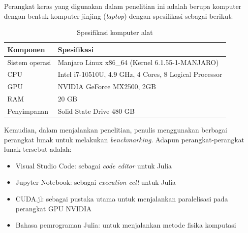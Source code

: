 Perangkat keras yang digunakan dalam penelitian ini adalah berupa komputer
dengan bentuk komputer jinjing (\emph{laptop}) dengan spesifikasi sebagai
berikut:

\begin{table}[H]
  \centering
  \caption{Spesifikasi komputer alat}
  \begin{tabular}{|M{5cm}|M{8cm}|}
    \hline
    \textbf{Komponen} & \textbf{Spesifikasi}                                   \\
    \hline
    Sistem operasi    & Manjaro Linux x86\_64 (Kernel 6.1.55-1-MANJARO)        \\
    \hline
    CPU               & Intel i7-10510U, 4.9 GHz, 4 Cores, 8 Logical Processor \\
    \hline
    GPU               & NVIDIA GeForce MX2500, 2GB                             \\
    \hline
    RAM               & 20 GB                                                  \\
    \hline
    Penyimpanan       & Solid State Drive 480 GB                               \\
    \hline
  \end{tabular}
\end{table}

Kemudian, dalam menjalankan penelitian, penulis menggunakan berbagai perangkat
lunak untuk melakukan \emph{benchmarking}. Adapun perangkat-perangkat lunak
tersebut adalah:
\begin{itemize}
  \item Visual Studio Code: sebagai \emph{code editor} untuk Julia

  \item Jupyter Notebook: sebagai \emph{execution cell} untuk Julia

  \item CUDA.jl: sebagai pustaka utama untuk menjalankan paralelisasi pada
        perangkat GPU NVIDIA

  \item Bahasa pemrograman Julia: untuk menjalankan metode fisika komputasi

\end{itemize}


